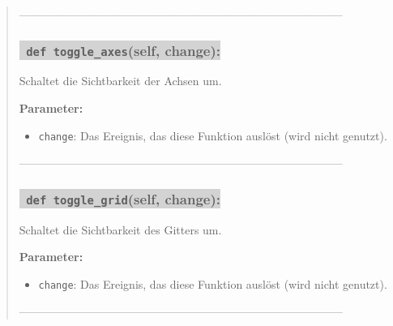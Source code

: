 \begin{quote}
    --------------------------------------------------------------------------------------



    \subsubsection*{\colorbox{lightgray}{\texttt{\textbf{\color{green} def} \color{blue} toggle\_axes}\textbf{(self, change):}}}
    Schaltet die Sichtbarkeit der Achsen um.

    \noindent \textbf{Parameter:} \vspace{-6ex} \\
    \begin{itemize}
        \setlength{\itemindent}{1em}  %
        \item \texttt{change}: Das Ereignis, das diese Funktion auslöst (wird nicht genutzt).
    \end{itemize}

    --------------------------------------------------------------------------------------



    \subsubsection*{\colorbox{lightgray}{\texttt{\textbf{\color{green} def} \color{blue} toggle\_grid}\textbf{(self, change):}}}
    Schaltet die Sichtbarkeit des Gitters um.

    \noindent \textbf{Parameter:} \vspace{-6ex} \\
    \begin{itemize}
        \setlength{\itemindent}{1em}  %
        \item \texttt{change}: Das Ereignis, das diese Funktion auslöst (wird nicht genutzt).
    \end{itemize}

    --------------------------------------------------------------------------------------










\end{quote}




